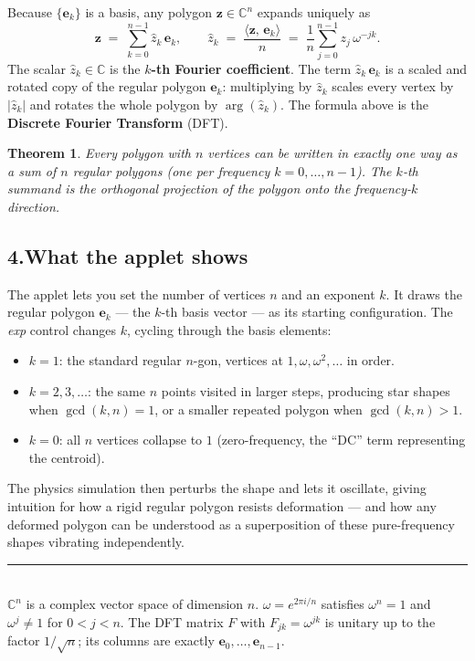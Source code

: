 \documentclass[11pt]{article}
\newtheorem*{theorem}{Theorem}
\begin{document}
Because $\{\mathbf{e}_k\}$ is a basis, any polygon $\mathbf{z} \in \mathbb{C}^n$
expands uniquely as
\[
  \mathbf{z}
  \;=\;
  \sum_{k=0}^{n-1} \hat{z}_k\, \mathbf{e}_k,
  \qquad
  \hat{z}_k
  \;=\;
  \frac{\langle \mathbf{z},\, \mathbf{e}_k \rangle}{n}
  \;=\;
  \frac{1}{n}\sum_{j=0}^{n-1} z_j\, \omega^{-jk}.
\]
The scalar $\hat{z}_k \in \mathbb{C}$ is the \textbf{$k$-th Fourier
coefficient}.  The term $\hat{z}_k\,\mathbf{e}_k$ is a scaled and rotated
copy of the regular polygon $\mathbf{e}_k$: multiplying by $\hat{z}_k$ scales
every vertex by $|\hat{z}_k|$ and rotates the whole polygon by $\arg(\hat{z}_k)$.
The formula above is the \textbf{Discrete Fourier Transform} (DFT).

\begin{theorem}
Every polygon with $n$ vertices can be written in exactly one way as a sum
of $n$ regular polygons (one per frequency $k = 0, \ldots, n{-}1$).
The $k$-th summand is the orthogonal projection of the polygon onto the
frequency-$k$ direction.
\end{theorem}

\subsection*{4.\enspace What the applet shows}

The applet lets you set the number of vertices $n$ and an exponent $k$.
It draws the regular polygon $\mathbf{e}_k$ — the $k$-th basis vector — as
its starting configuration.
The \emph{exp} control changes $k$, cycling through the basis elements:

\begin{itemize}
  \item $k = 1$: the standard regular $n$-gon, vertices at
        $1, \omega, \omega^2, \ldots$ in order.
  \item $k = 2, 3, \ldots$: the same $n$ points visited in larger steps,
        producing star shapes when $\gcd(k, n) = 1$, or a
        smaller repeated polygon when $\gcd(k,n) > 1$.
  \item $k = 0$: all $n$ vertices collapse to $1$ (zero-frequency, the
        ``DC'' term representing the centroid).
\end{itemize}

The physics simulation then perturbs the shape and lets it oscillate,
giving intuition for how a rigid regular polygon resists deformation — and
how any deformed polygon can be understood as a superposition of these
pure-frequency shapes vibrating independently.

\vfill
\noindent\rule{\linewidth}{0.4pt}\\[2pt]
{\small
$\mathbb{C}^n$ is a complex vector space of dimension $n$.
$\omega = e^{2\pi i/n}$ satisfies $\omega^n = 1$ and $\omega^j \neq 1$ for
$0 < j < n$.
The DFT matrix $F$ with $F_{jk} = \omega^{jk}$ is unitary up to the factor
$1/\sqrt{n}$; its columns are exactly $\mathbf{e}_0, \ldots, \mathbf{e}_{n-1}$.}
\end{document}
